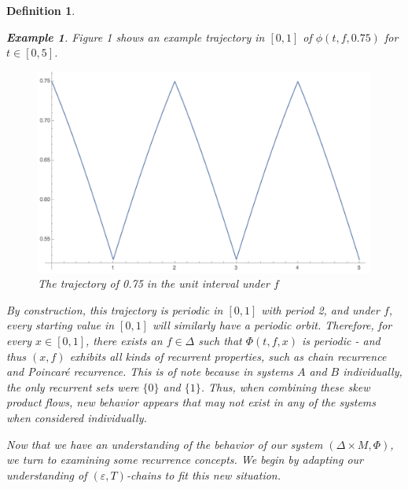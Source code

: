 \documentclass[11pt]{article}
\newtheorem{defn}[thm]{Definition}
\newtheorem{ex}[thm]{Example}
\begin{document}
\begin{defn}
\begin{ex}
\noindent Figure 1 shows an example trajectory in $[0,1]$ of $\phi(t,f,0.75)$ for $t\in[0,5]$.
\vspace{5mm}

\begin{figure}[!ht]\label{figure}
\begin{center}
\includegraphics[scale=0.45]{oscsys4}
\caption{The trajectory of 0.75 in the unit interval under $f$}
\end{center}
\end{figure}
\noindent By construction, this trajectory is periodic in $[0,1]$ with period 2, and under $f$, every starting value in $[0,1]$ will similarly have a periodic orbit. Therefore, for every $x\in[0,1]$, there exists an $f\in\Delta$ such that $\Phi(t,f,x)$ is periodic - and thus $(x,f)$ exhibits all kinds of recurrent properties, such as chain recurrence and Poincar\'e recurrence.  This is of note because in systems $A$ and $B$ individually, the only recurrent sets were $\{0\}$ and $\{1\}$.   Thus, when combining these skew product flows, new behavior appears that may not exist in any of the systems when considered individually.  \end{ex}

\indent Now that we have an understanding of the behavior of our system $(\Delta\times M, \Phi)$, we turn to examining some recurrence concepts.  We begin by adapting our understanding of $(\varepsilon,T)$-chains to fit this new situation. 



\end{defn}
\end{document}
